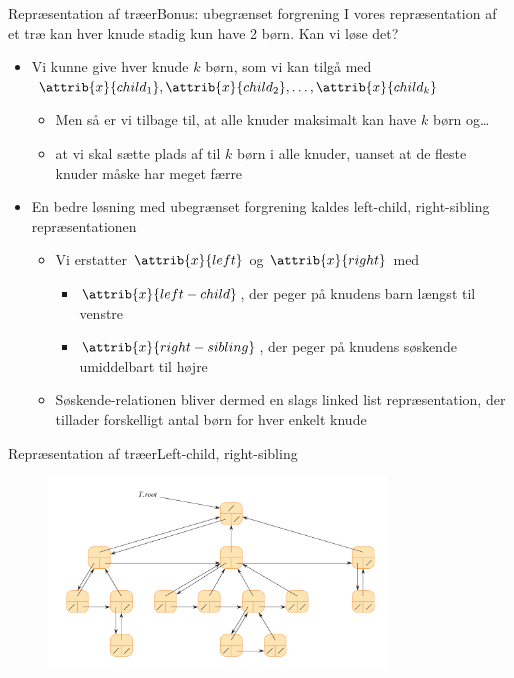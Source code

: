 \documentclass[aspectratio=1610]{beamer}
\begin{document}
\begin{frame}{Repræsentation af træer}{Bonus: ubegrænset forgrening}
    I vores repræsentation af et træ kan hver knude stadig kun have 2 børn. Kan
    vi løse det?

    \pause
    \begin{itemize}[<+->]
        \item Vi kunne give hver knude $k$ børn, som vi kan tilgå med
            $\attrib{x}{child_1}, \attrib{x}{child_2}, \ldots,
            \attrib{x}{child_k}$
            \begin{itemize}
                \item Men så er vi tilbage til, at alle knuder \alert{maksimalt}
                    kan have $k$ børn og\ldots
                \item at vi \alert{skal} sætte plads af til $k$ børn i alle
                    knuder, uanset at de fleste knuder måske har meget færre
            \end{itemize}
        \item En bedre løsning med ubegrænset forgrening kaldes
            \alert{left-child, right-sibling} repræsentationen
            \begin{itemize}
                \item Vi erstatter $\attrib{x}{left}$ og $\attrib{x}{right}$ med
                    \begin{itemize}
                        \item $\attrib{x}{left-child}$, der peger på knudens
                            barn længst til venstre
                        \item $\attrib{x}{right-sibling}$, der peger på knudens
                            søskende umiddelbart til højre
                    \end{itemize}
                \item Søskende-relationen bliver dermed en slags \alert{linked
                    list} repræsentation, der tillader forskelligt antal børn
                    for hver enkelt knude
            \end{itemize}
    \end{itemize}
\end{frame}


\begin{frame}{Repræsentation af træer}{Left-child, right-sibling}
    \begin{figure}[h]
        \centering
        \includegraphics[width=0.8\textwidth]{left-child-right-sib-tree}
    \end{figure}
\end{frame}
\end{document}
